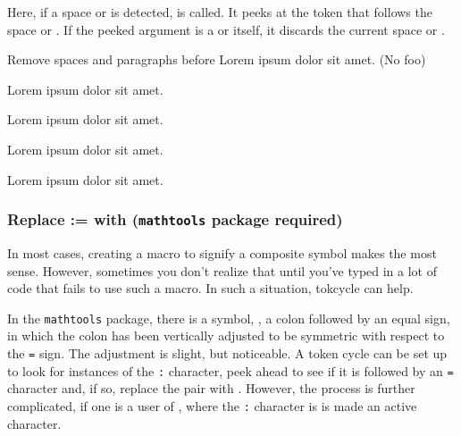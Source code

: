 \documentclass[10pt]{article}
\newcommand\TokCycle{\textsf{tokcycle}}
\begin{document}
\medskip
Here, if a space or  is detected,  is called.
  It peeks at the token that follows the space or .
If the peeked argument is a  or  itself, it discards 
  the current space or .

\begingroup


\begin{exampleA}[lefthand width=7cm]{Remove spaces and paragraphs before 
  }
\dofoo
Lorem ipsum dolor sit amet. (No foo)

Lorem ipsum dolor sit amet. \foo 

Lorem ipsum dolor sit amet.\foo 

Lorem ipsum dolor sit amet.
\foo 

Lorem ipsum dolor sit amet.

\foo 
\enddofoo
\end{exampleA}
\endgroup


\subsubsection{Replace := with  (\texttt{mathtools} 
  package required)}

In most cases, creating a macro to signify a composite symbol makes the most 
  sense.
However, sometimes you don't realize that until you've typed in a lot of code
  that fails to use such a macro.
In such a situation, \TokCycle{} can help.

\medskip
In the \texttt{mathtools} package, there is a symbol, ,
  a colon followed by an equal sign, in which the colon has been
  vertically adjusted to be symmetric with respect to the \texttt{=} sign.
The adjustment is slight, but noticeable.
A token cycle can be set up to look for instances of the \texttt{:} character,
  peek ahead to see if it is followed by an \texttt{=} character and, if so,
  replace the pair with .
However, the process is further complicated, if one is a user of
, where the \texttt{:} character is is made
  an active character.
\end{document}
